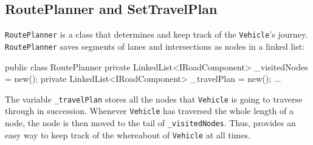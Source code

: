 \subsection{RoutePlanner and SetTravelPlan}
\verb|RoutePlanner|  is a class that determines and keep track of the \verb|Vehicle|'s journey. \verb|RoutePlanner| saves segments of lanes and intersections as nodes in a linked list:
\begin{csharp}
public class RoutePlanner
{
	private LinkedList<IRoadComponent> _visitedNodes = new();
	private LinkedList<IRoadComponent> _travelPlan = new();
	...
}
\end{csharp}
The variable \verb|_travelPlan| stores all the nodes that \verb|Vehicle| is going to traverse through in succession. Whenever \verb|Vehicle| has traversed the whole length of a node, the node is then moved to the tail of \verb|_visitedNodes|. Thus, provides an easy way to keep track of the whereabout of \verb|Vehicle| at all times.

